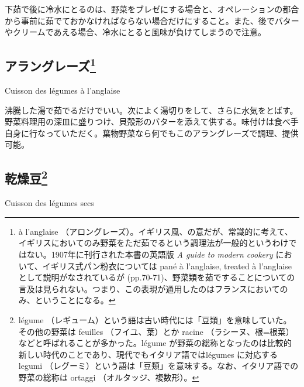 \begin{main}
\begin{frsecbenv}
\end{frsecbenv}

下茹で後に冷水にとるのは、野菜をブレゼにする場合と、オペレーションの都合から事前に茹でておかなければならない場合だけにすること。また、後でバターやクリームであえる場合、冷水にとると風味が負けてしまうので注意。

\hypertarget{cuisson-des-legumes-a-l-anglaise}{%
\subsection[アラングレーズ]{\texorpdfstring{アラングレーズ\footnote{à
  l'anglaise
  （アロングレーズ）。イギリス風、の意だが、常識的に考えて、イギリスにおいてのみ野菜をただ茹でるという調理法が一般的というわけではない。1907年に刊行された本書の英語版
  \emph{A guide to modern cookery}
  において、イギリス式パン粉衣については pané à l'anglaise, treated à
  l'anglaise として説明がなされているが
  (pp.70-71)、野菜類を茹ですることについての言及は見られない。つまり、この表現が通用したのはフランスにおいてのみ、ということになる。}}{アラングレーズ}}\label{cuisson-des-legumes-a-l-anglaise}}

\begin{frsecbenv}

Cuisson des légumes à l'anglaise

\end{frsecbenv}

沸騰した湯で茹でるだけでいい。次によく湯切りをして、さらに水気をとばす。野菜料理用の深皿に盛りつけ、貝殻形のバターを添えて供する。味付けは食べ手自身に行なっていただく。葉物野菜なら何でもこのアラングレーズで調理、提供可能。

\hypertarget{cuisson-des-legumes-secs}{%
\subsection[乾燥豆]{\texorpdfstring{乾燥豆\footnote{légume
  （レギューム）という語は古い時代には「豆類」を意味していた。その他の野菜は
  feuilles （フイユ、葉）とか racine
  （ラシーヌ、根=根菜）などと呼ばれることが多かった。légume
  が野菜の総称となったのは比較的新しい時代のことであり、現代でもイタリア語ではlégumes
  に対応する legumi
  （レグーミ）という語は「豆類」を意味する。なお、イタリア語での野菜の総称は
  ortaggi （オルタッジ、複数形）。}}{乾燥豆}}\label{cuisson-des-legumes-secs}}

\begin{frsecbenv}

Cuisson des légumes secs


\end{frsecbenv}
\end{main}

